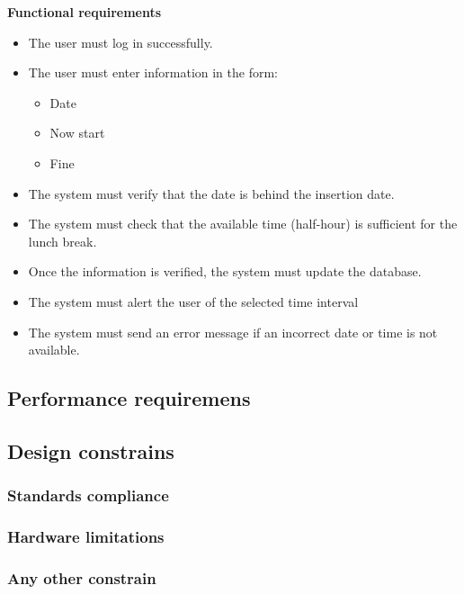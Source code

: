\documentclass{article}
\begin{document}
	
	\bigskip
	\noindent
	\textbf{Functional requirements} \\
	\begin{itemize}
		\item The user must log in successfully.
		\item The user must enter information in the form:
			\begin{itemize}
				\item Date
				\item Now start
				\item Fine
			\end{itemize}
		\item The system must verify that the date is behind the insertion date.
		\item The system must check that the available time (half-hour) is sufficient for the lunch break.
		\item Once the information is verified, the system must update the database.
		\item The system must alert the user of the selected time interval
		\item The system must send an error message if an incorrect date or time is not available.
	\end{itemize}

	
	\subsection{Performance requiremens}
	
	
	
	\subsection{Design constrains}
	
	
	
	\subsubsection{Standards compliance}
	
	
	
	\subsubsection{Hardware limitations}
	
	
	
	\subsubsection{Any other constrain}
	
\end{document}
